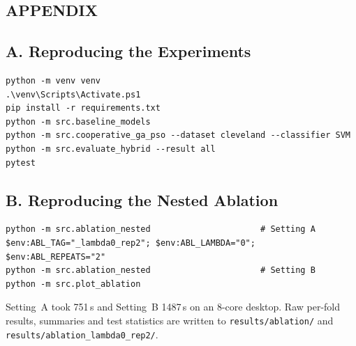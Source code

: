 \documentclass[MTech]{ugthesis}
\begin{document}
\begin{appendices}
\chapter*{APPENDIX}
\section*{A. Reproducing the Experiments}
\begin{verbatim}
python -m venv venv
.\venv\Scripts\Activate.ps1
pip install -r requirements.txt
python -m src.baseline_models
python -m src.cooperative_ga_pso --dataset cleveland --classifier SVM
python -m src.evaluate_hybrid --result all
pytest
\end{verbatim}

\section*{B. Reproducing the Nested Ablation}
\begin{verbatim}
python -m src.ablation_nested                      # Setting A
$env:ABL_TAG="_lambda0_rep2"; $env:ABL_LAMBDA="0"; $env:ABL_REPEATS="2"
python -m src.ablation_nested                      # Setting B
python -m src.plot_ablation
\end{verbatim}
Setting~A took 751\,s and Setting~B 1487\,s on an 8-core desktop. Raw per-fold results, summaries and test statistics are written to \texttt{results/ablation/} and \texttt{results/ablation\_lambda0\_rep2/}.
\end{appendices}
\end{document}
